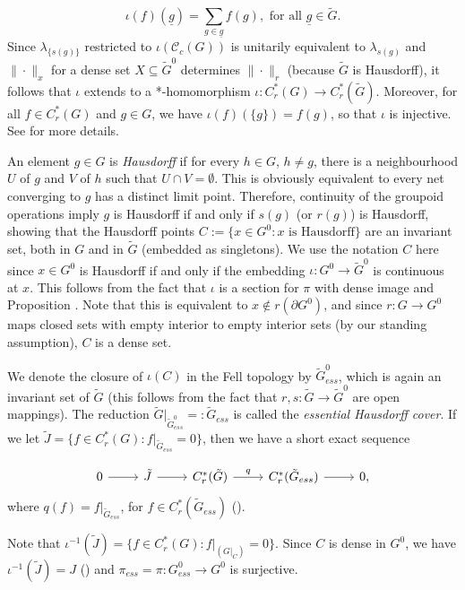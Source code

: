 \documentclass[a4paper, 12pt]{amsart}
\theoremstyle{definition}
\theoremstyle{remark}
\numberwithin{equation}{section}
\begin{document}
$$\iota(f)(\underline{g}) = \sum_{g\in \underline{g}}f(g), \text{ for all }\underline{g}\in \tilde{G}.$$ Since $\lambda_{\{s(g)\}}$ restricted to $\iota(\mathscr{C}_{c}(G))$ is unitarily equivalent to $\lambda_{s(g)}$ and $\|\cdot\|_{x}$ for a dense set $X\subseteq \tilde{G}^{0}$ determines $\|\cdot\|_{r}$ (because $\tilde{G}$ is Hausdorff), it follows that $\iota$ extends to a *-homomorphism $\iota:C^{*}_{r}(G)\to C^{*}_{r}(\tilde{G})$. Moreover, for all $f\in C^{*}_{r}(G)$ and $g\in G$, we have $\iota(f)(\{g\}) = f(g)$, so that $\iota$ is injective. See \cite[Lemma~3.8]{BGHL25} for more details.

An element $g\in G$ is \emph{Hausdorff} if for every $h\in G$, $h\neq g$, there is a neighbourhood $U$ of $g$ and $V$ of $h$ such that $U\cap V = \emptyset$. This is obviously equivalent to every net converging to $g$ has a distinct limit point. Therefore, continuity of the groupoid operations imply $g$ is Hausdorff if and only if $s(g)$ (or $r(g)$) is Hausdorff, showing that the Hausdorff points $C := \{x\in G^{0}:x \text{ is Hausdorff}\}$ are an invariant set, both in $G$ and in $\tilde{G}$ (embedded as singletons). We use the notation $C$ here since $x\in G^{0}$ is Hausdorff if and only if the embedding $\iota:G^{0}\to \tilde{G}^{0}$ is continuous at $x$. This follows from the fact that $\iota$ is a section for $\pi$ with dense image and Proposition \cite[Proposition~3.20]{BHL24}. Note that this is equivalent to $x\notin r(\partial G^{0})$, and since  $r:G\to G^{0}$ maps closed sets with empty interior to empty interior sets (by our standing assumption), $C$ is a dense set.

We denote the closure of $\iota(C)$ in the Fell topology by $\tilde{G}^{0}_{ess}$, which is again an invariant set of $\tilde{G}$ (this follows from the fact that $r,s:\tilde{G}\to \tilde{G}^{0}$ are open mappings). The reduction $\tilde{G}|_{\tilde{G}^{0}_{ess}} =:\tilde{G}_{ess}$ is called the \emph{essential Hausdorff cover}. If we let $\tilde{J} = \{f\in C^{*}_{r}(G): f|_{\tilde{G}_{ess}} = 0\}$, then we have a short exact sequence 

$$\begin{tikzcd}
0 \arrow[r] & \tilde{J} \arrow[r] & C^{*}_{r}(\tilde{G}) \arrow[r, "q"] & C^{*}_{r}(\tilde{G}_{ess}) \arrow[r] & 0,
\end{tikzcd}$$ where $q(f) = f|_{\tilde{G}_{ess}}$, for $f\in C^{*}_{r}(\tilde{G}_{ess})$ (\cite[Definition~4.14]{BGHL25}).

Note that $\iota^{-1}(\tilde{J}) = \{f\in C^{*}_{r}(G): f|_{(G|_{C})} = 0\}$. Since $C$ is dense in $G^{0}$, we have $\iota^{-1}(\tilde{J}) = J$ (\cite[Proposition~4.15]{BGHL25}) and $\pi_{ess} = \pi:G^{0}_{ess}\to G^{0}$ is surjective.
\end{document}
